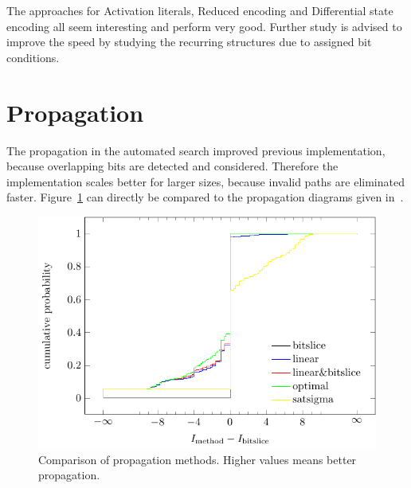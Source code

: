 The approaches for Activation literals, Reduced encoding and Differential state encoding all seem interesting and perform very good. Further study is advised to improve the speed by studying the recurring structures due to assigned bit conditions.

\section{Propagation}
%
The propagation in the automated search improved previous implementation, because overlapping bits are detected and considered. Therefore the implementation scales better for larger sizes, because invalid paths are eliminated faster. Figure~\ref{fig:sat-propagation} can directly be compared to the propagation diagrams given in~\cite{Cry16}.
%
\begin{figure}[t]
 \begin{center}
  \includegraphics{img/propagation.pdf}
  \caption[Comparison of propagation methods.]{Comparison of propagation methods. Higher values means better propagation.}
  \label{fig:sat-propagation}
 \end{center}
\end{figure}

